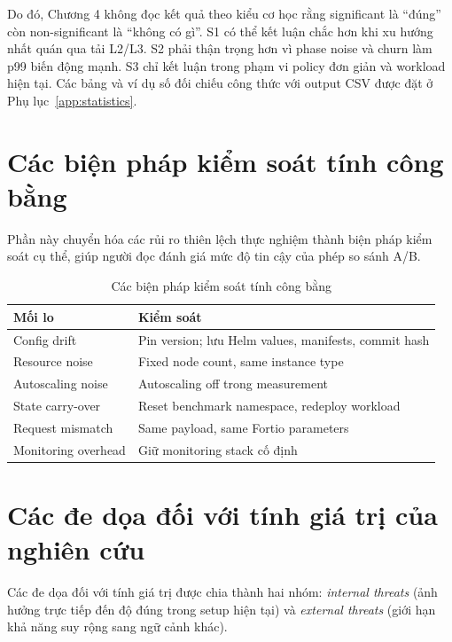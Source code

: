 Do đó, Chương 4 không đọc kết quả theo kiểu cơ học rằng significant là ``đúng'' còn non-significant là ``không có gì''. S1 có thể kết luận chắc hơn khi xu hướng nhất quán qua tải L2/L3. S2 phải thận trọng hơn vì phase noise và churn làm p99 biến động mạnh. S3 chỉ kết luận trong phạm vi policy đơn giản và workload hiện tại. Các bảng và ví dụ số đối chiếu công thức với output CSV được đặt ở Phụ lục~\ref{app:statistics}.


\section{Các biện pháp kiểm soát tính công bằng}
\label{sec:fairness-controls}

Phần này chuyển hóa các rủi ro thiên lệch thực nghiệm thành biện pháp kiểm soát cụ thể, giúp người đọc đánh giá mức độ tin cậy của phép so sánh A/B.

\begin{table}[H]
\centering
\caption{Các biện pháp kiểm soát tính công bằng}
\label{tab:fairness-controls}
\small
\setlength{\tabcolsep}{5pt}
\renewcommand{\arraystretch}{1.15}
\begin{tabularx}{\textwidth}{>{\raggedright\arraybackslash}p{3.3cm}X}
\toprule
\textbf{Mối lo} & \textbf{Kiểm soát} \\
\midrule
Config drift & Pin version; lưu Helm values, manifests, commit hash \\
Resource noise & Fixed node count, same instance type \\
Autoscaling noise & Autoscaling off trong measurement \\
State carry-over & Reset benchmark namespace, redeploy workload \\
Request mismatch & Same payload, same Fortio parameters \\
Monitoring overhead & Giữ monitoring stack cố định \\
\bottomrule
\end{tabularx}
\end{table}

\section{Các đe dọa đối với tính giá trị của nghiên cứu}
\label{sec:threats-to-validity}

Các đe dọa đối với tính giá trị được chia thành hai nhóm: \textit{internal threats} (ảnh hưởng trực tiếp đến độ đúng trong setup hiện tại) và \textit{external threats} (giới hạn khả năng suy rộng sang ngữ cảnh khác).

